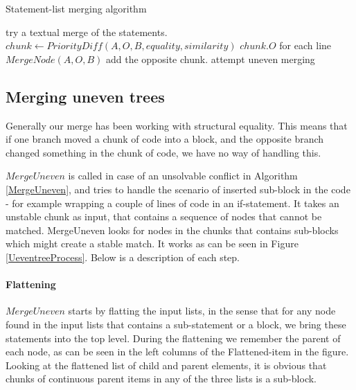 \documentclass[11pt]{article}
\begin{document}
\begin{algorithm}
  \caption{Statement-list merging algorithm}
  \label{MergeStatementList}
\begin{algorithmic}
    \State try  a textual merge of the statements.
        \State $chunk \gets PriorityDiff(A, O, B, equality, similarity)$
                \State \Return $chunk.O$
                \State for each line \Return $MergeNode(A, O, B)$
                \State add the opposite chunk.
            \Else
                \State attempt uneven merging
            \EndIf
        \EndFor
    \EndIf
\EndFunction
\end{algorithmic}
\end{algorithm}

\subsection{Merging uneven trees}
Generally our merge has been working with structural equality. This means that if one branch moved a chunk of code into a block, and the opposite branch changed something in the chunk of code, we have no way of handling this.

$MergeUneven$ is called in case of an unsolvable conflict in Algorithm \ref{MergeUneven}, and tries to handle the scenario of inserted sub-block in the code - for example wrapping a couple of lines of code in an if-statement. It takes an unstable chunk as input, that contains a sequence of nodes that cannot be matched. MergeUneven looks for nodes in the chunks that contains sub-blocks which might create a stable match. It works as can be seen in Figure \ref{UeventreeProcess}. Below is a description of each step.

\paragraph{Flattening} $MergeUneven$ starts by flatting the input lists, in the sense that for any node found in the input lists that contains a sub-statement or a block, we bring these statements into the top level. During the flattening we remember the parent of each node, as can be seen in the left columns of the Flattened-item in the figure. Looking at the flattened list of child and parent elements,  it is obvious that chunks of continuous parent items in any of the three lists is a sub-block.
\end{document}
